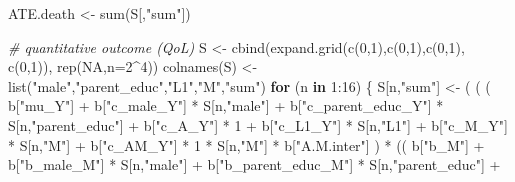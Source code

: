 \documentclass[
]{book}
\newenvironment{Shaded}{\begin{snugshade}}{\end{snugshade}}
\newcommand{\AttributeTok}[1]{\textcolor[rgb]{0.77,0.63,0.00}{#1}}
\newcommand{\CommentTok}[1]{\textcolor[rgb]{0.56,0.35,0.01}{\textit{#1}}}
\newcommand{\ConstantTok}[1]{\textcolor[rgb]{0.00,0.00,0.00}{#1}}
\newcommand{\ControlFlowTok}[1]{\textcolor[rgb]{0.13,0.29,0.53}{\textbf{#1}}}
\newcommand{\DecValTok}[1]{\textcolor[rgb]{0.00,0.00,0.81}{#1}}
\newcommand{\FunctionTok}[1]{\textcolor[rgb]{0.00,0.00,0.00}{#1}}
\newcommand{\NormalTok}[1]{#1}
\newcommand{\OtherTok}[1]{\textcolor[rgb]{0.56,0.35,0.01}{#1}}
\newcommand{\SpecialCharTok}[1]{\textcolor[rgb]{0.00,0.00,0.00}{#1}}
\newcommand{\StringTok}[1]{\textcolor[rgb]{0.31,0.60,0.02}{#1}}
\begin{document}
\begin{Shaded}
\begin{Highlighting}[]
\NormalTok{ATE.death }\OtherTok{\textless{}{-}} \FunctionTok{sum}\NormalTok{(S[,}\StringTok{"sum"}\NormalTok{])}


\CommentTok{\# quantitative outcome (QoL)}
\NormalTok{S }\OtherTok{\textless{}{-}} \FunctionTok{cbind}\NormalTok{(}\FunctionTok{expand.grid}\NormalTok{(}\FunctionTok{c}\NormalTok{(}\DecValTok{0}\NormalTok{,}\DecValTok{1}\NormalTok{),}\FunctionTok{c}\NormalTok{(}\DecValTok{0}\NormalTok{,}\DecValTok{1}\NormalTok{),}\FunctionTok{c}\NormalTok{(}\DecValTok{0}\NormalTok{,}\DecValTok{1}\NormalTok{), }\FunctionTok{c}\NormalTok{(}\DecValTok{0}\NormalTok{,}\DecValTok{1}\NormalTok{)), }\FunctionTok{rep}\NormalTok{(}\ConstantTok{NA}\NormalTok{,}\AttributeTok{n=}\DecValTok{2}\SpecialCharTok{\^{}}\DecValTok{4}\NormalTok{))}
\FunctionTok{colnames}\NormalTok{(S) }\OtherTok{\textless{}{-}} \FunctionTok{list}\NormalTok{(}\StringTok{"male"}\NormalTok{,}\StringTok{"parent\_educ"}\NormalTok{,}\StringTok{"L1"}\NormalTok{,}\StringTok{"M"}\NormalTok{,}\StringTok{"sum"}\NormalTok{)}
\ControlFlowTok{for}\NormalTok{ (n }\ControlFlowTok{in} \DecValTok{1}\SpecialCharTok{:}\DecValTok{16}\NormalTok{) \{}
\NormalTok{  S[n,}\StringTok{"sum"}\NormalTok{] }\OtherTok{\textless{}{-}}\NormalTok{ ( ( ( b[}\StringTok{"mu\_Y"}\NormalTok{] }\SpecialCharTok{+} 
\NormalTok{                        b[}\StringTok{"c\_male\_Y"}\NormalTok{] }\SpecialCharTok{*}\NormalTok{ S[n,}\StringTok{"male"}\NormalTok{] }\SpecialCharTok{+} 
\NormalTok{                        b[}\StringTok{"c\_parent\_educ\_Y"}\NormalTok{] }\SpecialCharTok{*}\NormalTok{ S[n,}\StringTok{"parent\_educ"}\NormalTok{] }\SpecialCharTok{+}
\NormalTok{                        b[}\StringTok{"c\_A\_Y"}\NormalTok{] }\SpecialCharTok{*} \DecValTok{1} \SpecialCharTok{+}
\NormalTok{                        b[}\StringTok{"c\_L1\_Y"}\NormalTok{] }\SpecialCharTok{*}\NormalTok{ S[n,}\StringTok{"L1"}\NormalTok{] }\SpecialCharTok{+}
\NormalTok{                        b[}\StringTok{"c\_M\_Y"}\NormalTok{] }\SpecialCharTok{*}\NormalTok{ S[n,}\StringTok{"M"}\NormalTok{] }\SpecialCharTok{+} 
\NormalTok{                        b[}\StringTok{"c\_AM\_Y"}\NormalTok{] }\SpecialCharTok{*} \DecValTok{1} \SpecialCharTok{*}\NormalTok{ S[n,}\StringTok{"M"}\NormalTok{] }\SpecialCharTok{*}\NormalTok{ b[}\StringTok{"A.M.inter"}\NormalTok{] ) }\SpecialCharTok{*}
\NormalTok{                      (( b[}\StringTok{"b\_M"}\NormalTok{] }\SpecialCharTok{+} 
\NormalTok{                           b[}\StringTok{"b\_male\_M"}\NormalTok{] }\SpecialCharTok{*}\NormalTok{ S[n,}\StringTok{"male"}\NormalTok{] }\SpecialCharTok{+} 
\NormalTok{                           b[}\StringTok{"b\_parent\_educ\_M"}\NormalTok{] }\SpecialCharTok{*}\NormalTok{ S[n,}\StringTok{"parent\_educ"}\NormalTok{] }\SpecialCharTok{+} 

\end{Highlighting}
\end{Shaded}
\end{document}

